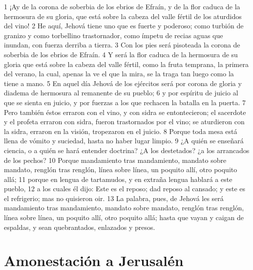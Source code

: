 1 ¡Ay de la corona de soberbia de los ebrios de Efraín, y de la flor caduca de la hermosura de su gloria, que está sobre la cabeza del valle fértil de los aturdidos del vino!
2 He aquí, Jehová tiene uno que es fuerte y poderoso; como turbión de granizo y como torbellino trastornador, como ímpetu de recias aguas que inundan, con fuerza derriba a tierra.
3 Con los pies será pisoteada la corona de soberbia de los ebrios de Efraín.
4 Y será la flor caduca de la hermosura de su gloria que está sobre la cabeza del valle fértil, como la fruta temprana, la primera del verano, la cual, apenas la ve el que la mira, se la traga tan luego como la tiene a mano.
5 En aquel día Jehová de los ejércitos será por corona de gloria y diadema de hermosura al remanente de su pueblo;
6 y por espíritu de juicio al que se sienta en juicio, y por fuerzas a los que rechacen la batalla en la puerta.
7 Pero también éstos erraron con el vino, y con sidra se entontecieron; el sacerdote y el profeta erraron con sidra, fueron trastornados por el vino; se aturdieron con la sidra, erraron en la visión, tropezaron en el juicio.
8 Porque toda mesa está llena de vómito y suciedad, hasta no haber lugar limpio.
9 ¿A quién se enseñará ciencia, o a quién se hará entender doctrina? ¿A los destetados? ¿a los arrancados de los pechos?
10 Porque mandamiento tras mandamiento, mandato sobre mandato, renglón tras renglón, línea sobre línea, un poquito allí, otro poquito allá;
11 porque en lengua de tartamudos, y en extraña lengua hablará a este pueblo,
12 a los cuales él dijo: Este es el reposo; dad reposo al cansado; y este es el refrigerio; mas no quisieron oir. 
13 La palabra, pues, de Jehová les será mandamiento tras mandamiento, mandato sobre mandato, renglón tras renglón, línea sobre línea, un poquito allí, otro poquito allá; hasta que vayan y caigan de espaldas, y sean quebrantados, enlazados y presos.

\section*{Amonestación a Jerusalén}

